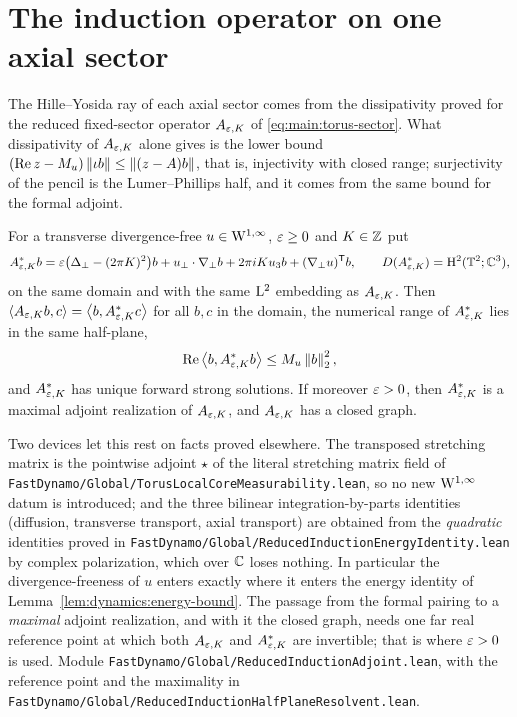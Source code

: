 \section{The induction operator on one axial sector}

The Hille--Yosida ray of each axial sector comes from the dissipativity proved for the
reduced fixed-sector operator $A_{\varepsilon,K} $ of \eqref{eq:main:torus-sector}.  What dissipativity of
$A_{\varepsilon,K} $ alone gives is the lower bound $(\operatorname{Re} z-M_u)\left\|\iota b\right\|\leq\left\|(z-A)b\right\| $,
that is, injectivity with closed range; surjectivity of the pencil is the Lumer--Phillips
half, and it comes from the same bound for the formal adjoint.

\begin{lemma}
  \label{lem:dynamics:reduced-adjoint}
  \leanok
  For a transverse divergence-free $u\in\mathrm{W}^{1,\infty} $, $\varepsilon\geq0 $ and $K\in\mathbb{Z} $ put
  \[
    A^*_{\varepsilon,K}b
    =\varepsilon\bigl(\Delta_\perp-(2\pi K)^2\bigr)b
    +u_\perp\cdot\nabla_\perp b+2\pi iKu_3b
    +(\nabla_\perp u)^{\mathsf T}b,
    \qquad D(A^*_{\varepsilon,K})=\mathrm{H}^2(\mathbb{T}^2;\mathbb{C}^3),
  \]
  on the same domain and with the same $\mathrm{L}^2 $ embedding as $A_{\varepsilon,K} $.  Then
  $\left\langle A_{\varepsilon,K}b,c\right\rangle=\left\langle b,A^*_{\varepsilon,K}c\right\rangle $ for all $b,c $ in the domain, the
  numerical range of $A^*_{\varepsilon,K} $ lies in the same half-plane,
  \[
    \operatorname{Re}\left\langle b,A^*_{\varepsilon,K}b\right\rangle\leq M_u\left\|b\right\|_2^2,
  \]
  and $A^*_{\varepsilon,K} $ has unique forward strong solutions.  If moreover $\varepsilon>0 $, then
  $A^*_{\varepsilon,K} $ is a maximal adjoint realization of $A_{\varepsilon,K} $, and $A_{\varepsilon,K} $ has a
  closed graph.
\end{lemma}

Two devices let this rest on facts proved elsewhere.  The transposed stretching matrix
is the pointwise adjoint $\star $ of the literal stretching matrix field of
\texttt{FastDynamo/Global/TorusLocalCoreMeasurability.lean}, so no new $\mathrm{W}^{1,\infty} $ datum is
introduced; and the three bilinear integration-by-parts identities (diffusion, transverse
transport, axial transport) are obtained from the \emph{quadratic} identities proved
in \texttt{FastDynamo/Global/ReducedInductionEnergyIdentity.lean} by complex polarization,
which over $\mathbb{C} $ loses nothing.  In particular the divergence-freeness of $u $ enters
exactly where it enters the energy identity of Lemma~\ref{lem:dynamics:energy-bound}.  The
passage from the formal pairing to a \emph{maximal} adjoint realization, and with it the
closed graph, needs one far real reference point at which both $A_{\varepsilon,K} $ and
$A^*_{\varepsilon,K} $ are invertible; that is where $\varepsilon>0 $ is used.  Module
\texttt{FastDynamo/Global/ReducedInductionAdjoint.lean}, with the reference point and the
maximality in \texttt{FastDynamo/Global/ReducedInductionHalfPlaneResolvent.lean}.

